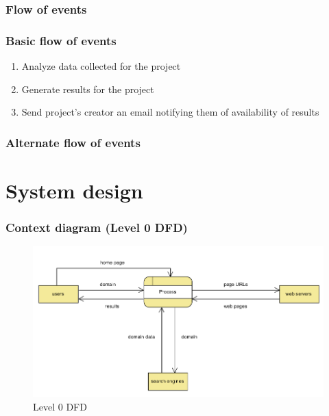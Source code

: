 \subsubsection{Flow of events}
\subsubsection{Basic flow of events}
\begin{enumerate}
\item Analyze data collected for the project
\item Generate results for the project
\item Send project's creator an email notifying them of availability of results
\end{enumerate}
\subsubsection{Alternate flow of events}


\section{System design}

\subsubsection{Context diagram (Level 0 DFD)}
\begin{figure}[H]
	\includegraphics[width=\linewidth,scale=0.5]{../static/img/contextdiagram.png}
	\caption{Level 0 DFD}
\end{figure}


